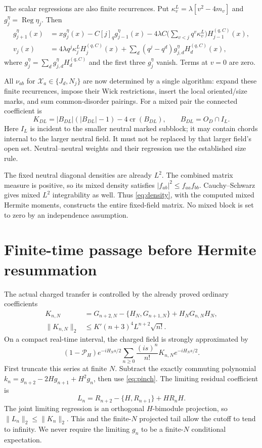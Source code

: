 \documentclass[11pt]{article}
\newcommand{\HH}{H^{(q,C)}}
\newcommand{\PP}{\mathcal P_H}
\newcommand{\crs}{\operatorname{cr}}
\newcommand{\Reg}{\operatorname{Reg}}
\begin{document}
The scalar regressions are also finite recurrences. Put
$\kappa_v^L=\lambda[v^2-4m_v]$ and $g_j^\eta=\Reg\eta_j$. Then
\begin{align}
 g_{j+1}^\eta(x)&=xg_j^\eta(x)-C[j]_qg_{j-1}^\eta(x)
 -4\lambda C\Big(\sum_{v<j}q^v\kappa_v^L\Big)\HH_{j-1}(x),\\
 v_j(x)&=4\lambda q^j\kappa_j^L\HH_j(x)
       +\sum_d(q^j-q^d)g_{j,d}^\eta\HH_d(x),
\end{align}
where $g_j^\eta=\sum_dg_{j,d}^\eta\HH_d$ and the first three $g_j^\eta$
vanish. Terms at $v=0$ are zero.

All $\nu_{ab}$ for $\mathcal X_a\in\{J_d,N_j\}$ are now determined
by a single algorithm: expand these finite recurrences, impose their
Wick restrictions, insert the local oriented/size marks, and sum
common-disorder pairings. For a mixed pair the connected coefficient is
\begin{equation}
 K_{DL}=|B_{DL}|(|B_{DL}|-1)-4\crs(B_{DL}),\qquad
 B_{DL}=O_D\cap I_L.
\end{equation}
Here $I_L$ is incident to the smaller neutral marked subblock; it may
contain chords internal to the larger neutral field. It must not be
replaced by that larger field's open set. Neutral--neutral weights
and their regression use the established size rule.

The fixed neutral diagonal densities are already $L^2$.
The combined matrix measure is positive, so its mixed density satisfies
$|f_{ab}|^2\le f_{aa}f_{bb}$. Cauchy--Schwarz gives mixed $L^2$
integrability as well. Thus \eqref{eq:density}, with the computed
mixed Hermite moments, constructs the entire fixed-field matrix.
No mixed block is set to zero by an independence assumption.

\newpage
\section{Finite-time passage before Hermite resummation}
The actual charged transfer is controlled by the already proved
ordinary coefficients
\begin{align}
 K_{n,N}&=G_{n+2,N}-\{H_N,G_{n+1,N}\}+H_NG_{n,N}H_N,\\
 \|K_{n,N}\|_2&\le K'(n+3)^4L^{n+2}\sqrt{n!}.
\end{align}
On a compact real-time interval, the charged field is strongly
approximated by
\begin{equation}
 (1-\PP)e^{-iH_Ns/2}
 \sum_{n\ge0}\frac{(is)^n}{n!}K_{n,N}e^{-iH_Ns/2}.\label{eq:ordinary}
\end{equation}
First truncate this series at finite $N$. Subtract the exactly
commuting polynomial
$k_n=g_{n+2}-2Hg_{n+1}+H^2g_n$, then use \eqref{eq:pinch}.
The limiting residual coefficient is
\begin{equation}
 L_n=R_{n+2}-\{H,R_{n+1}\}+HR_nH.
\end{equation}
The joint limiting regression is an orthogonal $H$-bimodule projection,
so $\|L_n\|_2\le\|K_n\|_2$. This and the finite-$N$ projected tail
allow the cutoff to tend to infinity. We never require the limiting
$g_n$ to be a finite-$N$ conditional expectation.
\end{document}
